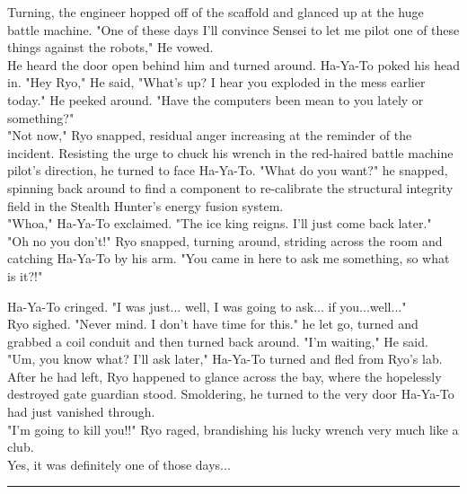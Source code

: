 \documentclass[11pt,twoside,a4paper]{book}
\begin{document}
\begin{multicols*}{2}
Turning, the engineer hopped off of the scaffold and glanced up at the huge battle machine. "One of these days I'll convince Sensei to let me pilot one of these things against the robots," He vowed. ~\\

He heard the door open behind him and turned around. Ha-Ya-To poked his head in. "Hey Ryo," He said, "What's up? I hear you exploded in the mess earlier today." He peeked around. "Have the computers been mean to you lately or something?" ~\\

"Not now," Ryo snapped, residual anger increasing at the reminder of the incident. Resisting the urge to chuck his wrench in the red-haired battle machine pilot's direction, he turned to face Ha-Ya-To. "What do you want?" he snapped, spinning back around to find a component to re-calibrate the structural integrity field in the Stealth Hunter's energy fusion system. ~\\

"Whoa," Ha-Ya-To exclaimed. "The ice king reigns. I'll just come back later." ~\\

"Oh no you don't!" Ryo snapped, turning around, striding across the room and catching Ha-Ya-To by his arm. "You came in here to ask me something, so what is it?!" %

Ha-Ya-To cringed. "I was just... well, I was going to ask... if you...well..." ~\\

Ryo sighed. "Never mind. I don't have time for this." he let go, turned and grabbed a coil conduit and then turned back around. "I'm waiting," He said. ~\\

"Um, you know what? I'll ask later," Ha-Ya-To turned and fled from Ryo's lab. After he had left, Ryo happened to glance across the bay, where the hopelessly destroyed gate guardian stood. Smoldering, he turned to the very door Ha-Ya-To had just vanished through. ~\\

"I'm going to kill you!!" Ryo raged, brandishing his lucky wrench very much like a club. ~\\

Yes, it was definitely one of those days... %

\begin{center} \rule{0.45\textwidth}{0.01cm} \end{center}


\end{multicols*}
\end{document}
